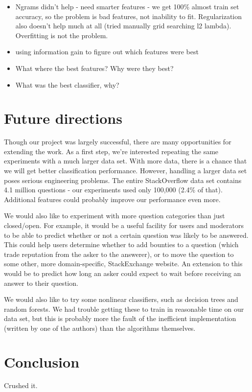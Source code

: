\documentclass[11pt]{article}
\begin{document}
\begin{itemize}
  \item Ngrams didn’t help - need smarter features - we get 100\%
    almost train set accuracy, so the problem is bad features, not
    inability to fit. Regularization also doesn’t help much at all
    (tried manually grid searching l2 lambda). Overfitting is not the
    problem.
  \item using information gain to figure out which features were best
  \item What where the best features? Why were they best?
  \item What was the best classifier, why?
\end{itemize}

\section{Future directions}
Though our project was largely successful, there are many
opportunities for extending the work.  As a first step, we're
interested repeating the same experiments with a much larger data
set. With more data, there is a chance that we will get better
classification performance. However, handling a larger data set poses
serious engineering problems.  The entire
StackOverflow data set contains 4.1 million questions - our experiments used only 100,000 (2.4\% of that). 
Additional features could probably improve our performance even more.

We would also like to experiment with more question categories than just closed/open. For example, it would be a useful facility for users and moderators to be able to predict whether or not a certain question was likely to be answered. This could help users determine whether to add bounties to a question (which trade reputation from the asker to the answerer), or to move the question to some other, more domain-specific, StackExchange website. An extension to this would be to predict how long an asker could expect to wait before receiving an answer to their question.

We would also like to try some nonlinear classifiers, such as decision trees and random forests. We had trouble getting these to train in reasonable time on our data set, but this is probably more the fault of the inefficient implementation (written by one of the authors) than the algorithms themselves.

\section{Conclusion}

Crushed it.

{}

\end{document}

